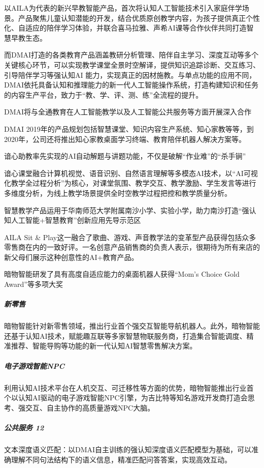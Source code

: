 \documentclass[letterpaper,10pt,english]{sphinxmanual}
\begin{document}
以AILA为代表的新兴早教智能产品，首次将认知人工智能技术引入家庭伴学场景。产品聚焦儿童认知潜能的开发，结合优质原创教学内容，为孩子提供真正个性化、自适应的陪伴学习体验，并联合喜马拉雅、声希AI课等合作伙伴共同打造智慧早教生态。

而DMAI打造的各类教育产品涵盖教研分析管理、陪伴自主学习、深度互动等多个关键核心环节，可以实现教学课堂全景时空解译，提供知识追踪诊断、交互练习、引导陪伴学习等强认知AI
能力，实现真正的因材施教。与单点功能的应用不同，DMAI依托具备认知和推理能力的新一代人工智能操作系统，打造构建知识和任务的内容生产平台，致力于“教、学、评、测、练”全流程的提升。

DMAI将与全通教育在人工智能教学以及人工智能公共服务等方面开展深入合作

DMAI
2019年的产品规划包括智慧课堂、知识内容生产系统、知心家教等等，到2020年，公司还将推出知心家教桌面学习终端、教育陪伴机器人解决方案等。

谙心助教率先实现的AI自动解题与讲题功能，不仅是破解“作业难”的“杀手锏”

谙心课堂融合计算机视觉、语音识别、自然语言理解等多模态AI技术，以“AI可视化教学全过程分析”为核心，对课堂氛围、教学交互、教学激励、学生发言等进行多维度分析，为线上教学场景提供全时空教学过程把控和教学质量分析。

智慧教学产品运用于华南师范大学附属南沙小学、实验小学，助力南沙打造“强认知人工智能+智慧教育”创新应用先导示范区

AILA Sit \&
Play这一融合了歌曲、游戏、声音教学法的变革型产品获得包括众多零售商在内的一致好评。一名创意产品销售商的负责人表示，很期待为所有来店的新父母们展示这种创意性的AI+教育产品。

暗物智能研发了具有高度自适应能力的桌面机器人获得“Mom’s Choice Gold
Award”等多项大奖


\subparagraph{新零售}
\label{\detokenize{chapter_AI_company/dm-ai:id10}}
暗物智能针对新零售领域，推出行业首个强交互智能导航机器人。此外，暗物智能还基于认知AI技术，赋能趣互联等多家智慧物联服务商，打造集合智能调度、精准推荐、智能导购等功能的新一代认知AI智慧零售解决方案。


\subparagraph{电子游戏智能NPC}
\label{\detokenize{chapter_AI_company/dm-ai:npc}}
利用认知AI技术平台在人机交互、可迁移性等方面的优势，暗物智能推出行业首个以认知AI驱动的电子游戏智能NPC引擎，为吉比特等知名游戏开发商打造会思考、强交互、自主协作的高质量游戏NPC大脑。


\subparagraph{公共服务 12\sphinxfootnotemark[1015]}
\label{\detokenize{chapter_AI_company/dm-ai:id11}}%
\begin{footnotetext}[1015]\sphinxAtStartFootnote
{}
%
\end{footnotetext}\ignorespaces 
文本深度语义匹配：以DMAI自主训练的强认知深度语义匹配模型为基础，可以准确理解不同句法结构下的语义信息，精准匹配问答答案，实现高效互动。
\end{document}
